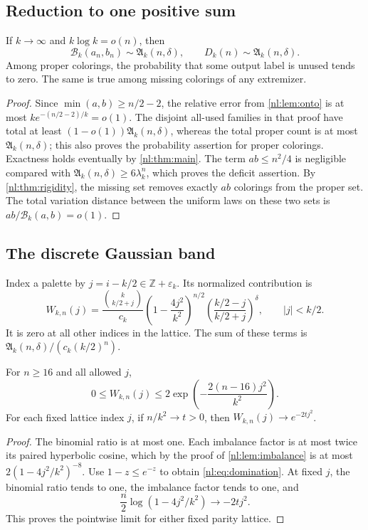 \documentclass[11pt,a4paper]{article}
\numberwithin{equation}{section}
\theoremstyle{definition}
\theoremstyle{remark}
\newcommand{\Z}{\mathbb Z}
\newcommand{\Bip}{\mathcal B}
\newcommand{\nlenv}{\mathfrak A}
\begin{document}
\subsection{Reduction to one positive sum}
\begin{lemma}\label{nl:lem:asympreduction}
If $k\to\infty$ and $k\log k=o(n)$, then
\begin{equation}\label{nl:eq:asympreduction}
 \Bip_k(a_n,b_n)\sim\nlenv_k(n,\delta),\qquad
 D_k(n)\sim\nlenv_k(n,\delta).
\end{equation}
Among proper colorings, the probability that some output label is unused
tends to zero. The same is true among missing colorings of any extremizer.
\end{lemma}
\begin{proof}
Since $\min(a,b)\ge n/2-2$, the relative error from
\cref{nl:lem:onto} is at most $ke^{-(n/2-2)/k}=o(1)$.
The disjoint all-used families in that proof have total at least
$(1-o(1))\nlenv_k(n,\delta)$, whereas the total proper count is at most
$\nlenv_k(n,\delta)$; this also proves the probability assertion for proper
colorings. Exactness holds eventually by \cref{nl:thm:main}.
The term $ab\le n^2/4$ is negligible compared with
$\nlenv_k(n,\delta)\ge6\lambda_k^n$, which proves the deficit assertion.
By \cref{nl:thm:rigidity}, the missing set removes exactly $ab$ colorings
from the proper set. The total variation distance between the uniform
laws on these two sets is $ab/\Bip_k(a,b)=o(1)$.
\end{proof}

\subsection{The discrete Gaussian band}
Index a palette by $j=i-k/2\in\Z+\varepsilon_k$. Its normalized contribution is
\begin{equation}\label{nl:eq:term}
 W_{k,n}(j)=
 \frac{\binom{k}{k/2+j}}{c_k}
 \left(1-\frac{4j^2}{k^2}\right)^{n/2}
 \left(\frac{k/2-j}{k/2+j}\right)^\delta,
 \qquad |j|<k/2.
\end{equation}
It is zero at all other indices in the lattice. The sum of these terms is
$\nlenv_k(n,\delta)/(c_k(k/2)^n)$.

\begin{lemma}\label{nl:lem:domination}
For $n\ge16$ and all allowed $j$,
\begin{equation}\label{nl:eq:domination}
 0\le W_{k,n}(j)\le
 2\exp\left(-\frac{2(n-16)j^2}{k^2}\right).
\end{equation}
For each fixed lattice index $j$, if $n/k^2\to t>0$, then
$W_{k,n}(j)\to e^{-2tj^2}$.
\end{lemma}
\begin{proof}
The binomial ratio is at most one. Each imbalance factor is at most twice
its paired hyperbolic cosine, which by the proof of \cref{nl:lem:imbalance}
is at most $2(1-4j^2/k^2)^{-8}$. Use $1-z\le e^{-z}$ to obtain
\eqref{nl:eq:domination}. At fixed $j$, the binomial ratio tends to one,
the imbalance factor tends to one, and
\[
 \frac n2\log(1-4j^2/k^2)\longrightarrow-2tj^2.
\]
This proves the pointwise limit for either fixed parity lattice.
\end{proof}
\end{document}

